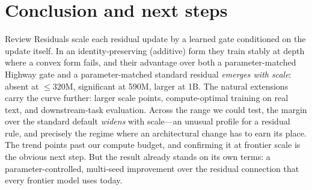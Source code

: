 \documentclass[11pt]{article}
\begin{document}
\section{Conclusion and next steps}\label{sec:conclusion}
Review Residuals scale each residual update by a learned gate conditioned on the update itself. In an
identity-preserving (additive) form they train stably at depth where a convex form fails, and their advantage
over both a parameter-matched Highway gate and a parameter-matched standard residual \emph{emerges with scale}:
absent at $\le 320$M, significant at 590M, larger at 1B. The natural extensions carry the curve further: larger scale points,
compute-optimal training on real text, and downstream-task evaluation. Across the range we could test, the margin over the standard default \emph{widens} with
scale---an unusual profile for a residual rule, and precisely the regime where an architectural change has to
earn its place. The trend points past our compute budget, and confirming it at frontier scale is the obvious
next step. But the result already stands on its own terms: a parameter-controlled, multi-seed improvement over
the residual connection that every frontier model uses today.
\end{document}
